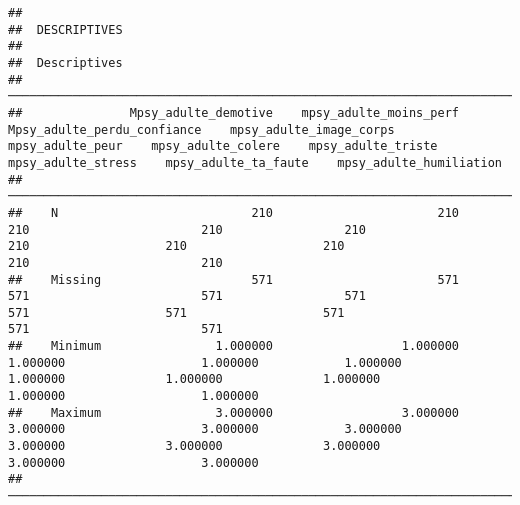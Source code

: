 \documentclass[
]{article}
\begin{document}
\begin{verbatim}
## 
##  DESCRIPTIVES
## 
##  Descriptives                                                                                                                                                                                                                                                     
##  ──────────────────────────────────────────────────────────────────────────────────────────────────────────────────────────────────────────────────────────────────────────────────────────────────────────────────────────────────────────────────────────────── 
##               Mpsy_adulte_demotive    mpsy_adulte_moins_perf    Mpsy_adulte_perdu_confiance    mpsy_adulte_image_corps    mpsy_adulte_peur    mpsy_adulte_colere    mpsy_adulte_triste    mpsy_adulte_stress    mpsy_adulte_ta_faute    mpsy_adulte_humiliation   
##  ──────────────────────────────────────────────────────────────────────────────────────────────────────────────────────────────────────────────────────────────────────────────────────────────────────────────────────────────────────────────────────────────── 
##    N                           210                       210                            210                        210                 210                   210                   210                   210                     210                        210   
##    Missing                     571                       571                            571                        571                 571                   571                   571                   571                     571                        571   
##    Minimum                1.000000                  1.000000                       1.000000                   1.000000            1.000000              1.000000              1.000000              1.000000                1.000000                   1.000000   
##    Maximum                3.000000                  3.000000                       3.000000                   3.000000            3.000000              3.000000              3.000000              3.000000                3.000000                   3.000000   
##  ────────────────────────────────────────────────────────────────────────────────────────────────────────────────────────────────────────────────────────────────────────────────────────────────────────────────────────────────────────────────────────────────
\end{verbatim}
\end{document}

